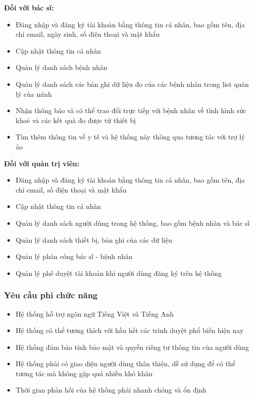 \textbf{Đối với bác sĩ:}
\begin{adjustwidth}{1.5em}{}
\begin{itemize}
    \item Đăng nhập và đăng ký tài khoản bằng thông tin cá nhân, bao gồm tên, địa chỉ email, ngày sinh, số điện thoại và mật khẩu
    \item Cập nhật thông tin cá nhân
    \item Quản lý danh sách bệnh nhân
    \item Quản lý danh sách các bản ghi dữ liệu đo của các bệnh nhân trong list quản lý của mình
    \item Nhận thông báo và có thể trao đổi trực tiếp với bệnh nhân về tình hình sức khoẻ và các kết quả đo được từ thiết bị
    \item Tìm thêm thông tin về y tế và hệ thống này thông qua tương tác với trợ lý ảo 
\end{itemize}
\end{adjustwidth}
\textbf{Đối với quản trị viên:}
\begin{adjustwidth}{1.5em}{}
\begin{itemize}
    \item Đăng nhập và đăng ký tài khoản bằng thông tin cá nhân, bao gồm tên, địa chỉ email, số điện thoại và mật khẩu
    \item Cập nhật thông tin cá nhân
    \item Quản lý danh sách người dùng trong hệ thống, bao gồm bệnh nhân và bác sĩ
    \item Quản lý danh sách thiết bị, bản ghi của các dữ liệu
    \item Quản lý phân công bác sĩ - bệnh nhân
    \item Quản lý phê duyệt tài khoản khi người dùng đăng ký trên hệ thống
\end{itemize}
\end{adjustwidth}

\subsubsection{Yêu cầu phi chức năng}
\begin{itemize}
    \item Hệ thống hỗ trợ ngôn ngữ Tiếng Việt và Tiếng Anh
    \item Hệ thống có thể tương thích với hầu hết các trình duyệt phổ biến hiện nay
    \item Hệ thống đảm bảo tính bảo mật và quyền riêng tư thông tin của người dùng
    \item Hệ thống phải có giao diện người dùng thân thiện, dễ sử dụng để có thể tương tác mà không gặp quá nhiều khó khăn
    \item Thời gian phản hồi của hệ thống phải nhanh chóng và ổn định
\end{itemize}

